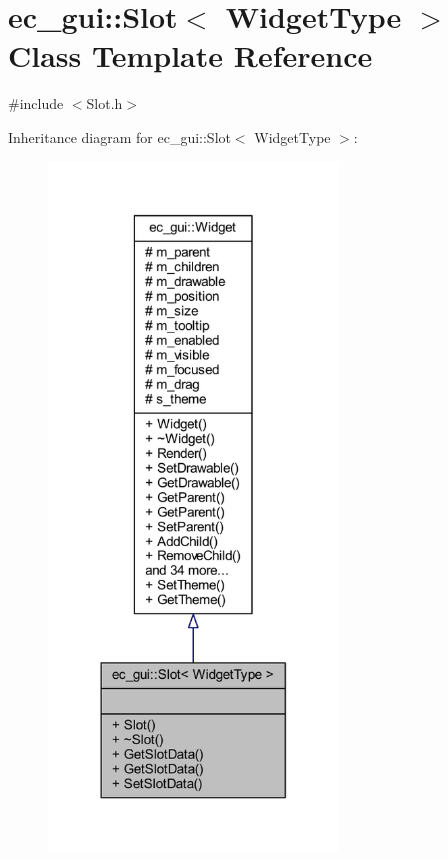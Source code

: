 \hypertarget{classec__gui_1_1_slot}{}\section{ec\+\_\+gui\+:\+:Slot$<$ Widget\+Type $>$ Class Template Reference}
\label{classec__gui_1_1_slot}


{\ttfamily \#include $<$Slot.\+h$>$}



Inheritance diagram for ec\+\_\+gui\+:\+:Slot$<$ Widget\+Type $>$\+:\nopagebreak
\begin{figure}[H]
\begin{center}
\leavevmode
\includegraphics[width=218pt]{classec__gui_1_1_slot__inherit__graph}
\end{center}
\end{figure}


